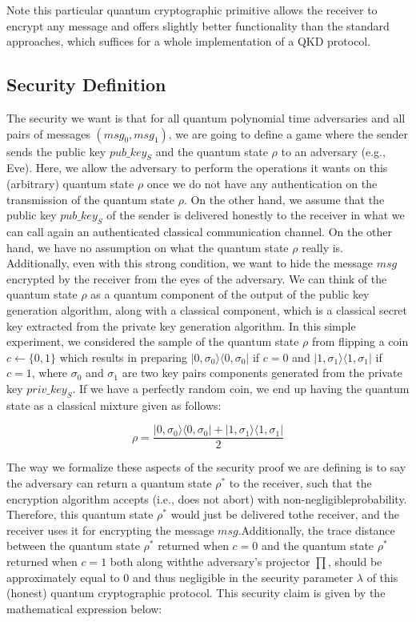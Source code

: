\documentclass[12pt]{article}
\begin{document}
    
    
    \noindent Note this particular quantum cryptographic primitive allows the receiver to encrypt any message and offers slightly better functionality than the standard approaches, which suffices for a whole implementation of a QKD protocol.
    
    \subsection{Security Definition}
    \label{subsec:security-definition}

    The security we want is that for all quantum polynomial time adversaries and all pairs of messages $({msg}_{0}, {msg}_{1})$, we are going to define a game where the sender sends the public key ${pub\_key}_{S}$ and the quantum state $\rho$ to an adversary (e.g., Eve). Here, we allow the adversary to perform the operations it wants on this (arbitrary) quantum state $\rho$ once we do not have any authentication on the transmission of the quantum state $\rho$. On the other hand, we assume that the public key ${pub\_key}_{S}$ of the sender is delivered honestly to the receiver in what we can call again an authenticated classical communication channel. On the other hand, we have no assumption on what the quantum state $\rho$ really is. Additionally, even with this strong condition, we want to hide the message $msg$ encrypted by the receiver from the eyes of the adversary. We can think of the quantum state $\rho$ as a quantum component of the output of the public key generation algorithm, along with a classical component, which is a classical secret key extracted from the private key generation algorithm. In this simple experiment, we considered the sample of the quantum state $\rho$ from flipping a coin $c \leftarrow \{0, 1\}$ which results in preparing $|0, {\sigma}_{0}\rangle\langle0,{\sigma}_{0}|$ if $c = 0$ and $|1, {\sigma}_{1}\rangle\langle1,{\sigma}_{1}|$ if $c = 1$, where ${\sigma}_{0}$ and ${\sigma}_{1}$ are two key pairs components generated from the private key ${priv\_key}_{S}$. If we have a perfectly random coin, we end up having the quantum state as a classical mixture given as follows:
    
    $$\rho = \frac{|0, {\sigma}_{0}\rangle\langle0,{\sigma}_{0}| + |1, {\sigma}_{1}\rangle\langle1,{\sigma}_{1}|}{2}$$
    
    \noindent The way we formalize these aspects of the security proof we are defining is to say the adversary can return a quantum state ${\rho}^{*}$ to the receiver, such that the encryption algorithm accepts (i.e., does not abort) with non-negligible\break probability. Therefore, this quantum state ${\rho}^{*}$ would just be delivered to\break the receiver, and the receiver uses it for encrypting the message $msg$.\break Additionally, the trace distance between the quantum state ${\rho}^{*}$ returned when $c = 0$ and the quantum state ${\rho}^{*}$ returned when $c = 1$ both along with\break the adversary's projector $\prod$, should be approximately equal to $0$ and thus negligible in the security parameter $\lambda$ of this (honest) quantum cryptographic protocol. This security claim is given by the mathematical expression below:
\end{document}
